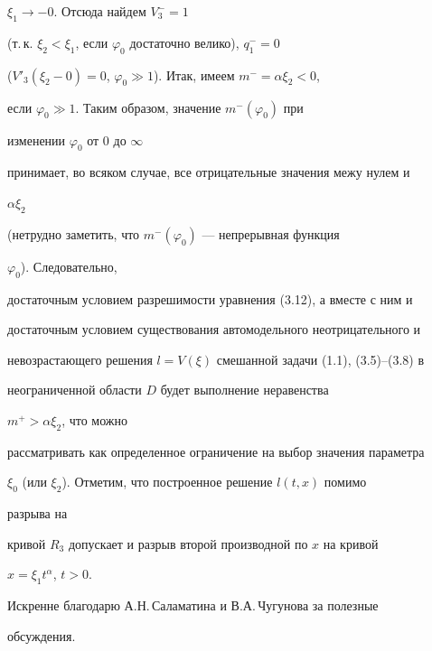 $\xi_1\to-0$. Отсюда найдем $V^-_3=1$ 


(т.\,к. $\xi_2<\xi_1$, если $\varphi_0$ достаточно велико), $q^-_1=0$ 


($V'_3(\xi_2-0)=0$, $\varphi_0\gg1$). Итак, имеем $m^-=\alpha\xi_2<0$, 


если $\varphi_0\gg1$. Таким образом, значение $m^-(\varphi_0)$ при 


изменении $\varphi_0$ от 0 до $\infty$ 


принимает, во всяком случае, все отрицательные значения межу нулем и 


$\alpha\xi_2$ 


(нетрудно заметить, что $m^-(\varphi_0)$ --- непрерывная функция 


$\varphi_0$). Следовательно, 


достаточным условием разрешимости уравнения (3.12), а вместе с ним и 


достаточным условием существования автомодельного неотрицательного и 


невозрастающего решения $l=V(\xi)$ смешанной задачи (1.1), (3.5)--(3.8) в 


неограниченной области $D$ будет выполнение неравенства 


$m^+>\alpha\xi_2$, что можно 


рассматривать как определенное ограничение на выбор значения параметра 


$\xi_0$ (или $\xi_2$). Отметим, что построенное решение $l(t,x)$ помимо 


разрыва на 


кривой $R_3$ допускает и разрыв второй производной по $x$ на кривой 


$x=\xi_1t^\alpha$, $t>0$. 


 


Искренне благодарю А.Н.\,Саламатина и В.А.\,Чугунова за полезные 


обсуждения. 


 


 


